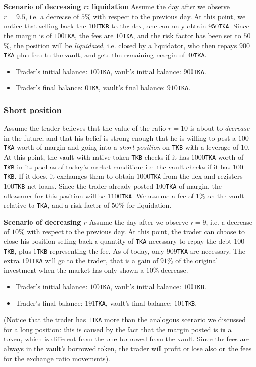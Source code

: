\documentclass[a4paper,10 pt]{article}
\theoremstyle{definition}
\begin{document}
\textbf{Scenario of decreasing $r$: liquidation}
Assume the day after we observe $r = 9.5$, i.e. a decrease of $5$\% with respect to the previous day.  At this point, we notice that selling back the $100$\verb|TKB| to the dex, one can only obtain $950$\verb|TKA|. Since the margin is of $100$\verb|TKA|, the fees are $10$\verb|TKA|, and the risk factor has been set to $50$\%, the position will be \emph{liquidated}, i.e. closed by a liquidator, who then repays $900$\verb|TKA| plus fees to the vault, and gets the remaining margin of $40$\verb|TKA|.
\begin{itemize}
    \item Trader's initial balance: $100$\verb|TKA|, vault's initial balance: $900$\verb|TKA|.
    \item Trader's final balance: $0$\verb|TKA|, vault's final balance: $910$\verb|TKA|.
\end{itemize}

\subsubsection{Short position}

Assume the trader believes that the value of the ratio $r = 10$ is about to \emph{decrease} in the future, and that his belief is strong enough that he is willing to post a $100$\verb|TKA| worth of margin and going into a \emph{short position} on \verb|TKB| with a leverage of $10$. At this point, the vault with native token \verb|TKB| checks if it has $1000$\verb|TKA| worth of \verb|TKB| in its pool as of today's market condition: i.e. the vault checks if it has $100$\verb|TKB|. If it does, it exchanges them to obtain $1000$\verb|TKA| from the dex and registers $100$\verb|TKB| net loans. Since the trader already posted $100$\verb|TKA| of margin, the allowance for this position will be $1100$\verb|TKA|. We assume a fee of 1\% on the vault relative to \verb|TKA|, and a risk factor of $50$\% for liquidation.

\textbf{Scenario of decreasing $r$}
Assume the day after we observe $r = 9$, i.e. a decrease of $10$\% with respect to the previous day. At this point, the trader can choose to close his position selling back a quantity of \verb|TKA| necessary to repay the debt $100$\verb|TKB|, plus $1$\verb|TKB| representing the fee. As of today, only $909$\verb|TKA| are necessary. The extra $191$\verb|TKA| will go to the trader, that is a gain of $91$\% of the original investment when the market has only shown a $10$\% decrease. 
\begin{itemize}
    \item Trader's initial balance: $100$\verb|TKA|, vault's initial balance: $100$\verb|TKB|.
    \item Trader's final balance: $191$\verb|TKA|, vault's final balance: $101$\verb|TKB|.
\end{itemize}
(Notice that the trader has $1$\verb|TKA| more than the analogous scenario we discussed for a long position: this is caused by the fact that the margin posted is in a token, which is different from the one borrowed from the vault. Since the fees are always in the vault's borrowed token, the trader will profit or lose also on the fees for the exchange ratio movements).
\end{document}
